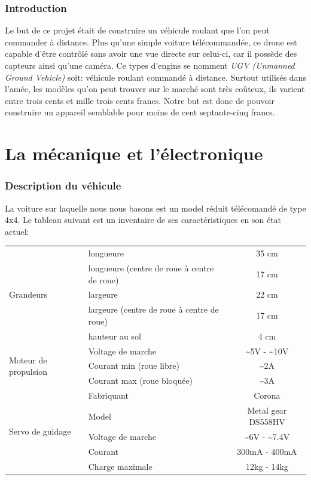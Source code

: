 \documentclass[a4paper,12pt]{article}
\begin{document}
{\section{Introduction}
Le but de ce projet était de construire un véhicule roulant que l'on peut commander à distance. Plus qu'une simple voiture télécommandée, ce drone est capable d'être contrôlé sans avoir une vue directe sur celui-ci, car il possède des capteurs ainsi qu'une caméra. Ce types d'engins se nomment \textit{UGV (Unmanned Ground Vehicle)} soit: véhicule roulant commandé à distance. Surtout utilisés dans l'amée, les modèles qu'on peut trouver sur le marché sont très coûteux, ils varient entre trois cents et mille trois cents francs. Notre but est donc de pouvoir construire un appareil semblable pour moins de cent septante-cinq francs. 

\part{La mécanique et l'électronique}


\section{Description du v\'ehicule \label{TableDesc}}
La voiture sur laquelle nous nous basons est un model r\'eduit
t\'el\'ecomand\'e de type 4x4. Le tableau suivant est un inventaire de 
ses caractéristiques en son \'etat actuel:

\begin{center}
  \begin{tabular}{|p{4cm}|p{4cm}|c|}
    \hline
    \multirow{5}{*}{Grandeurs}
    &longueure & 35 cm \\ \cline{2-3}
    &longueure (centre de roue \`a centre de roue)& 17 cm \\ \cline{2-3}
    &largeure & 22 cm \\ \cline{2-3}
    &largeure (centre de roue \`a centre de roue) & 17 cm \\ \cline{2-3}
    & hauteur au sol & 4 cm\\ \hline
    \multirow{3}{*}{Moteur de propulsion}
    & Voltage de marche & \~{}5V - \~{}10V  \\ \cline{2-3}
    & Courant min (roue libre) & \~{}2A \\ \cline{2-3}
    & Courant max (roue bloqu\'ee) & \~{}3A \\ \hline
    \multirow{5}{*}{Servo de guidage}
    & Fabriquant & Corona \\ \cline{2 - 3}
    & Model & Metal gear DS558HV\\ \cline{2-3}
    & Voltage de marche & \~{}6V - \~{}7.4V  \\ \cline{2-3}
    & Courant & 300mA - 400mA \\ \cline{2-3}
    & Charge maximale & 12kg - 14kg \\  
 \hline
	\end{tabular}
\end{center}

}
\end{document}
